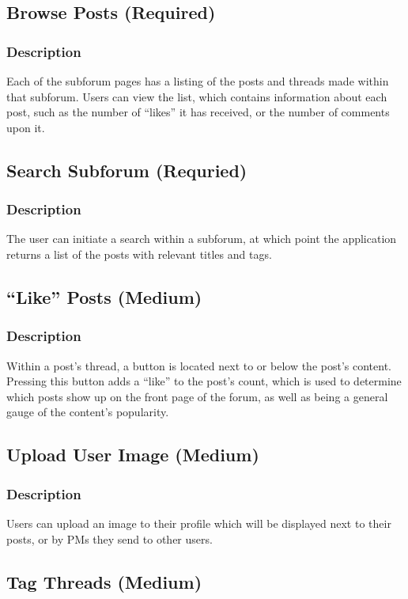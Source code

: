 \documentclass[12pt]{scrartcl}
\begin{document}
\subsection{Browse Posts (Required)}
\subsubsection{Description}
Each of the subforum pages has a listing of the posts and threads made within that subforum. Users can view the list, which contains
information about each post, such as the number of “likes” it has received, or the number of comments upon it.

\subsection{Search Subforum (Requried)}
\subsubsection{Description}
The user can initiate a search within a subforum, at which point the application returns a list of the posts with relevant titles and tags.

\subsection{“Like” Posts (Medium)}
\subsubsection{Description}
Within a post’s thread, a button is located next to or below the post’s content. Pressing this button adds a “like” to the post’s count, which is used to
determine which posts show up on the front page of the forum, as well as being a general gauge of the content’s popularity.

\subsection{Upload User Image (Medium)}
\subsubsection{Description}

Users can upload an image to their profile which will be displayed next to their posts, or by PMs they send to other users.

\subsection{Tag Threads (Medium)}
\end{document}
